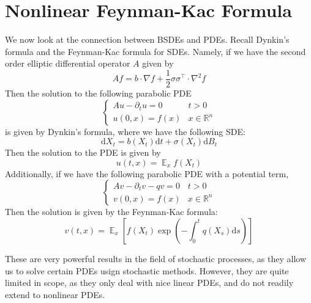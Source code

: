 \documentclass{amsart}
\newcommand{\rr}{\mathbb R}    %
\DeclareMathOperator{\ee}{\mathbb E}
\theoremstyle{definition}
\theoremstyle{remark}
\numberwithin{equation}{section}
\begin{document}
\section{Nonlinear Feynman-Kac Formula}
We now look at the connection between BSDEs and PDEs. Recall Dynkin's formula and the Feynman-Kac formula for SDEs. 
Namely, if we have the second order elliptic differential operator $A$ given by
\[
Af = b \cdot \nabla f + \frac12 \sigma\sigma^\intercal \cdot \nabla^2 f
\]
Then the solution to the following parabolic PDE
\begin{equation}
    \begin{cases}
        Au - \partial_t u = 0 & t > 0\\
        u(0, x) = f(x)  & x\in \rr^n
    \end{cases}
\end{equation}
is given by Dynkin's formula, where we have the following SDE:
\begin{equation}
\mathrm{d} X_t = b(X_t) \mathrm{d} t + \sigma(X_t) \mathrm{d} B_t
\end{equation}
Then the solution to the PDE is given by
\begin{equation}
    u(t, x) = \ee_x f(X_t)
\end{equation}
Additionally, if we have the following parabolic PDE with a potential term, 
\begin{equation}
    \begin{cases}
        Av - \partial_t v - q v = 0 & t > 0 \\
        v(0, x) = f(x) & x \in \rr^n 
    \end{cases}
\end{equation}
Then the solution is given by the Feynman-Kac formula:
\begin{equation}
    v(t, x) = \ee_x \left[
        f(X_t) \exp\left(
            -\int_0^t q(X_s) \mathrm{d} s
        \right)
    \right]
\end{equation}

These are very powerful results in the field of stochastic processes, as they allow us to solve certain PDEs usign stochastic methods. 
However, they are quite limited in scope, as they only deal with nice linear PDEs, and do not readily extend to nonlinear PDEs. 
\end{document}
